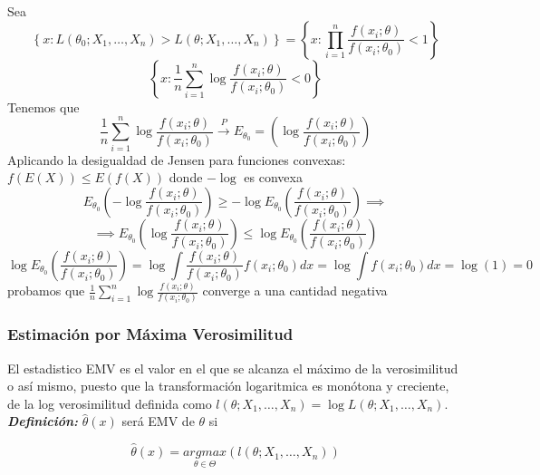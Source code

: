 \begin{proofs}
    Sea
    \[
        \left\{x:L(\theta_0;X_1,\dots,X_n)>L(\theta;X_1,\dots,X_n)\right\}=\left\{x:\prod_{i=1}^{n}\frac{f(x_i;\theta)}{f(x_i;\theta_0)}<1\right\}
    \]
    \[
        \left\{x:\frac{1}{n}\sum_{i=1}^{n}\log{\frac{f(x_i;\theta)}{f(x_i;\theta_0)}}<0\right\}
    \]
    Tenemos que
    \[
        \frac{1}{n}\sum_{i=1}^{n}\log{\frac{f(x_i;\theta)}{f(x_i;\theta_0)}} \overset{P}{\to}E_{\theta_0}=\left(\log{\frac{f(x_i;\theta)}{f(x_i;\theta_0)}}\right)
    \]
    Aplicando la desigualdad de Jensen para funciones convexas: $f(E(X)) \leq E(f(X))$ donde $-\log$ es convexa
    \[
        E_{\theta_0}\left(-\log{\frac{f(x_i;\theta)}{f(x_i;\theta_0)}}\right) \geq -\log{E_{\theta_0}\left(\frac{f(x_i;\theta)}{f(x_i;\theta_0)}\right)} \implies
    \]
    \[
        \implies E_{\theta_0}\left(\log{\frac{f(x_i;\theta)}{f(x_i;\theta_0)}}\right) \leq \log{E_{\theta_0}\left(\frac{f(x_i;\theta)}{f(x_i;\theta_0)}\right)}
    \]
    \[
        \log{E_{\theta_0}\left(\frac{f(x_i;\theta)}{f(x_i;\theta_0)}\right)}=\log\int\frac{f(x_i;\theta)}{f(x_i;\theta_0)}f(x_i;\theta_0)dx=\log\int f(x_i;\theta_0)dx=\log(1)=0
    \]
    probamos que $\frac{1}{n}\sum_{i=1}^{n}\log{\frac{f(x_i;\theta)}{f(x_i;\theta_0)}}$ converge a una cantidad negativa
\end{proofs}

\subsubsection{Estimación por Máxima Verosimilitud}

El estadistico EMV es el valor en el que se alcanza el máximo de la verosimilitud o así mismo, puesto que la transformación logaritmica es monótona y creciente, de la log verosimilitud definida como $l(\theta;X_1,\dots,X_n)=\log L(\theta;X_1,\dots,X_n)$. \\

\textbf{\textit{Definición: }} $\hat{\theta}(x)$ será EMV de $\theta$ si

\[
    \hat{\theta}(x) = \underset{\theta \in \Theta}{argmax}(l(\theta;X_1,\dots,X_n))
\]

